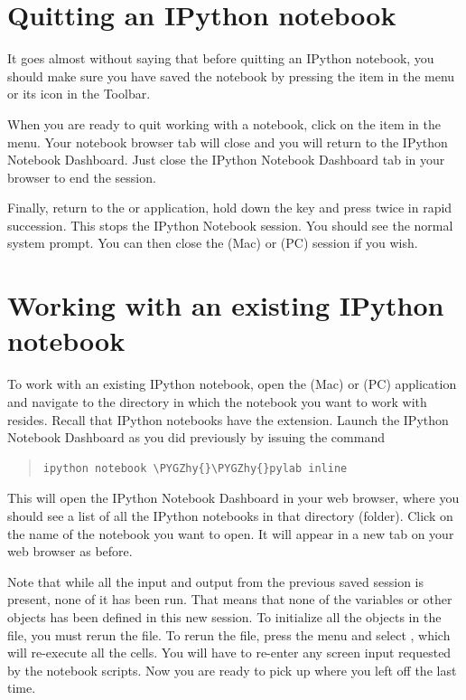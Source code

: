 \documentclass[letterpaper,10pt,english]{sphinxmanual}
\def\PYGZhy{\char`\-}
\begin{document}
\section{Quitting an IPython notebook}
\label{apdx2/apdx2_ipynb:quitting-an-ipython-notebook}
It goes almost without saying that before quitting an IPython notebook, you should make sure you have saved the notebook by pressing the  item in the  menu or its icon in the Toolbar.

When you are ready to quit working with a notebook, click on the  item in the  menu.  Your notebook browser tab will close and you will return to the IPython Notebook Dashboard.  Just close the IPython Notebook Dashboard tab in your browser to end the session.

Finally, return to the  or  application, hold down the  key and press  twice in rapid succession.  This stops the IPython Notebook session.  You should see the normal system prompt.  You can then close the  (Mac) or  (PC) session if you wish.


\section{Working with an existing IPython notebook}
\label{apdx2/apdx2_ipynb:working-with-an-existing-ipython-notebook}
To work with an existing IPython notebook, open the  (Mac) or  (PC) application and navigate to the directory in which the notebook you want to work with resides.  Recall that IPython notebooks have the  extension.  Launch the IPython Notebook Dashboard as you did previously by issuing the command
\begin{quote}

\begin{Verbatim}[commandchars=\\\{\}]
ipython notebook \PYGZhy{}\PYGZhy{}pylab inline
\end{Verbatim}
\end{quote}

This will open the IPython Notebook Dashboard in your web browser, where you should see a list of all the IPython notebooks in that directory (folder).  Click on the name of the notebook you want to open.  It will appear in a new tab on your web browser as before.

Note that while all the input and output from the previous saved session is present, none of it has been run.  That means that none of the variables or other objects has been defined in this new session.  To initialize all the objects in the file, you must rerun the file.  To rerun the file, press the  menu and select , which will re-execute all the cells.  You will have to re-enter any screen input requested by the notebook scripts.  Now you are ready to pick up where you left off the last time.
\label{apdx3/apdx3_resources::doc}
\end{document}
